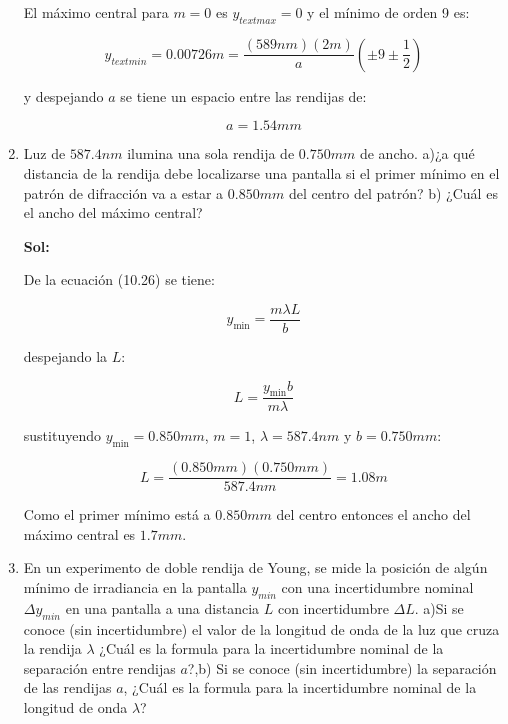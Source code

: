 \documentclass[12pt,a4paper]{article}
\begin{document}
\begin{enumerate}
El máximo central para $m=0$ es $y_{text{max}}=0$ y el mínimo de orden 9 es:

\begin{equation*}
    y_{text{min}} = 0.00726m = \frac{(589nm) (2m)}{a} \left(\pm 9 \pm \frac{1}{2}\right)
\end{equation*}

y despejando $a$ se tiene un espacio entre las rendijas de:

\begin{equation*}
    a= 1.54 mm
\end{equation*}






\item Luz de $587.4nm$ ilumina una sola rendija de $0.750mm$ de ancho. a)¿a qué distancia de la rendija debe localizarse una pantalla si el primer mínimo en el patrón de difracción va a estar a $0.850mm$ del centro del patrón? b) ¿Cuál es el ancho del máximo central?

\textbf{Sol:}

De la ecuación (10.26) se tiene:

\begin{equation*}
    y_{\text{min}} = \frac{m\lambda L}{b}
\end{equation*}

despejando la $L$:

\begin{equation*}
    L = \frac{y_{\text{min}}b}{m\lambda}
\end{equation*}

sustituyendo $y_{\text{min}}= 0.850 mm$, $m = 1$, $\lambda = 587.4 nm$ y $b = 0.750mm$:

\begin{equation*}
    L = \frac{(0.850 mm)(0.750mm)}{587.4nm} = 1.08 m
\end{equation*}

Como el primer mínimo está a $0.850mm$ del centro entonces el ancho del máximo central es $1.7mm$.






\item En un experimento de doble rendija de Young, se mide la posición de algún mínimo de irradiancia en la pantalla $y_{min}$ con una incertidumbre nominal $\Delta y_{min}$ en una pantalla a una distancia $L$ con incertidumbre $\Delta L$. a)Si se conoce (sin incertidumbre) el valor de la longitud de onda de la luz que cruza la rendija $\lambda$ ¿Cuál es la formula para la incertidumbre nominal de la separación entre rendijas $a$?,b) Si se conoce (sin incertidumbre) la separación de las rendijas $a$, ¿Cuál es la formula para la incertidumbre nominal de la longitud de onda $\lambda$?


\end{enumerate}
\end{document}
